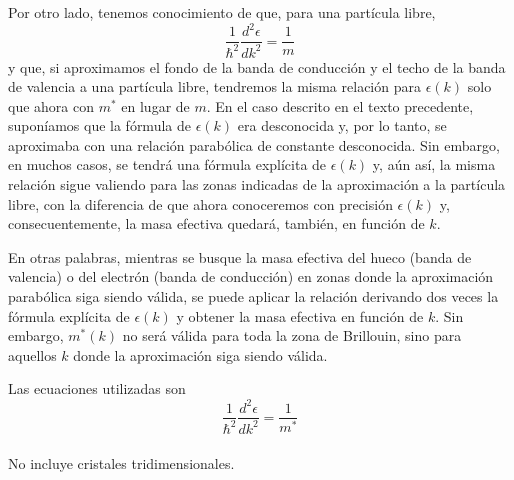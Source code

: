 \documentclass[12pt,a4paper]{article}
\begin{document}
Por otro lado, tenemos conocimiento de que, para una partícula libre,
\[ \frac{1}{\hbar^{2}} \frac{d^{2} \epsilon}{dk^{2}} = \frac{1}{m} \]
y que, si aproximamos el fondo de la banda de conducción y el techo de la banda de valencia a una partícula libre, tendremos la misma relación para $\epsilon(k)$ solo que ahora con $m^{\ast}$ en lugar de $m$. En el caso descrito en el texto precedente, suponíamos que la fórmula de $\epsilon(k)$ era desconocida y, por lo tanto, se aproximaba con una relación parabólica de constante desconocida. Sin embargo, en muchos casos, se tendrá una fórmula explícita de $\epsilon(k)$ y, aún así, la misma relación sigue valiendo para las zonas indicadas de la aproximación a la partícula libre, con la diferencia de que ahora conoceremos con precisión $\epsilon(k)$ y, consecuentemente, la masa efectiva quedará, también, en función de $k$.

En otras palabras, mientras se busque la masa efectiva del hueco (banda de valencia) o del electrón (banda de conducción) en zonas donde la aproximación parabólica siga siendo válida, se puede aplicar la relación derivando dos veces la fórmula explícita de $\epsilon(k)$ y obtener la masa efectiva en función de $k$. Sin embargo, $m^{\ast}(k)$ no será válida para toda la zona de Brillouin, sino para aquellos $k$ donde la aproximación siga siendo válida.

Las ecuaciones utilizadas son
\begin{equation}
\frac{1}{\hbar^{2}} \frac{d^{2} \epsilon}{dk^{2}}=\frac{1}{m^{\ast}}
\end{equation}
\paragraph{}
\scriptsize{No incluye cristales tridimensionales.}
\end{document}
